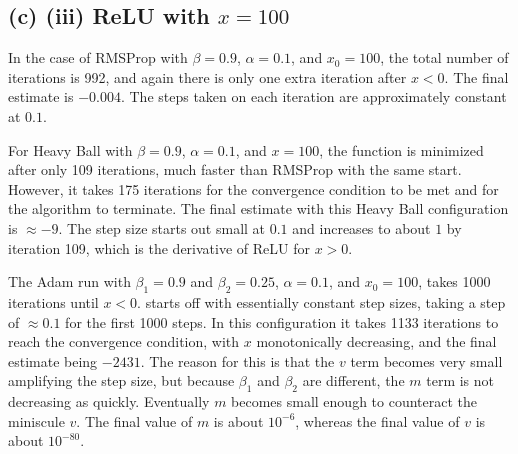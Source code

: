 \subsection{(c) (iii) ReLU with $x=100$}
In the case of RMSProp with $\beta=0.9$, $\alpha=0.1$, and $x_0=100$, the total number of iterations is 992,
and again there is only one extra iteration after $x<0$.
The final estimate is $-0.004$. The steps taken on each iteration are approximately constant at $0.1$.

For Heavy Ball with $\beta=0.9$, $\alpha=0.1$, and $x=100$, the function is minimized after only 109 iterations,
much faster than RMSProp with the same start.
However, it takes 175 iterations for the convergence condition to be met and for the algorithm to terminate.
The final estimate with this Heavy Ball configuration is $\approx-9$.
The step size starts out small at $0.1$ and increases to about $1$ by iteration 109, which
is the derivative of ReLU for $x>0$.

The Adam run with $\beta_1=0.9$ and $\beta_2=0.25$, $\alpha=0.1$, and $x_0=100$, 
takes 1000 iterations until $x<0$.
starts off with essentially constant step sizes, taking a step of $\approx0.1$ for the first 1000 steps.
In this configuration it takes 1133 iterations to reach the convergence condition, with
$x$ monotonically decreasing, and the final estimate being $-2431$.
The reason for this is that the $v$ term becomes very small amplifying the step size,
but because $\beta_1$ and $\beta_2$ are different, the $m$ term is not decreasing
as quickly.
Eventually $m$ becomes small enough to counteract the miniscule $v$.
The final value of $m$ is about $10^{-6}$, whereas the final value of $v$ is about  $10^{-80}$.

